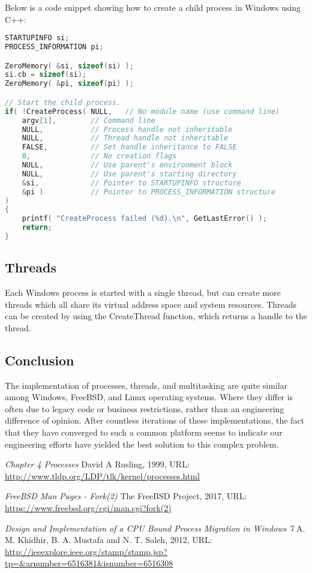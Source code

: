 \documentclass[letterpaper,draftclsnofoot,10pt,onecolumn,titlepage]{IEEEtran}\usepackage[margin=0.75in]{geometry}
\begin{document}
    Below is a code snippet showing how to create a child process in Windows using C++:
\begin{lstlisting}[language=C++]
STARTUPINFO si;
PROCESS_INFORMATION pi;

ZeroMemory( &si, sizeof(si) );
si.cb = sizeof(si);
ZeroMemory( &pi, sizeof(pi) );

// Start the child process.
if( !CreateProcess( NULL,   // No module name (use command line)
    argv[1],        // Command line
    NULL,           // Process handle not inheritable
    NULL,           // Thread handle not inheritable
    FALSE,          // Set handle inheritance to FALSE
    0,              // No creation flags
    NULL,           // Use parent's environment block
    NULL,           // Use parent's starting directory
    &si,            // Pointer to STARTUPINFO structure
    &pi )           // Pointer to PROCESS_INFORMATION structure
)
{
    printf( "CreateProcess failed (%d).\n", GetLastError() );
    return;
}
\end{lstlisting}

    \subsection{Threads}
    Each Windows process is started with a single thread, but can create more threads which all share its virtual
    address space and system resources. Threads can be created by using the CreateThread function, which returns a
    handle to the thread.
    
    
    \subsection{Conclusion}
    The implementation of processes, threads, and multitasking are quite similar among Windows, FreeBSD, and Linux 
    operating systems. Where they differ is often due to legacy code or business restrictions, rather than an 
    engineering difference of opinion. After countless iterations of these implementations, the fact that they 
    have converged to such a common platform seems to indicate our engineering efforts have yielded the best 
    solution to this complex problem.
    
    \begin{thebibliography}{3}
    
	\textit{Chapter 4 Processes}
	David A Rusling, 1999, URL: \url{http://www.tldp.org/LDP/tlk/kernel/processes.html}
	
	\textit{FreeBSD Man Pages - Fork(2)}
	The FreeBSD Project, 2017, URL: \url{https://www.freebsd.org/cgi/man.cgi?fork(2)}
	
	\textit{Design and Implementation of a CPU Bound Process Migration in Windows 7}
	A. M. Khidhir, B. A. Mustafa and N. T. Saleh, 2012, URL: \url{http://ieeexplore.ieee.org/stamp/stamp.jsp?tp=&arnumber=6516381&isnumber=6516308}
        
    \end{thebibliography}
\end{document}
